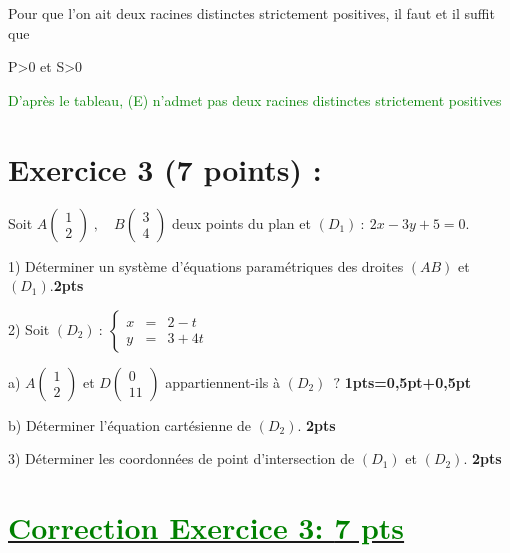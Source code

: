 \documentclass[12pt]{article}
\begin{document}
Pour que l'on ait deux racines distinctes strictement positives, il faut et il suffit que

 P>0 et S>0

\textcolor{green}{D'après le tableau, (E) n'admet pas deux racines distinctes strictement positives}

 

\section*{Exercice 3 (7 points) :}
Soit $A\begin{pmatrix} 1 \\ 2\end{pmatrix}\;,\quad B\begin{pmatrix} 3 \\ 4\end{pmatrix}$ deux points du plan et $(D_{1})\ :\ 2x-3y+5=0.$

1) Déterminer un système d'équations paramétriques des droites $(AB)$ et $(D_{1}).$\textbf{2pts}

2) Soit $(D_{2})\ :\ \left\lbrace\begin{array}{rcl} x&=&2-t \\ y&=&3+4t\end{array}\right.$

a) $A\begin{pmatrix} 1 \\ 2\end{pmatrix}$ et $D\begin{pmatrix} 0 \\ 11\end{pmatrix}$ appartiennent-ils à $(D_{2})\;\ ?$ \textbf{1pts=0,5pt+0,5pt}

b) Déterminer l'équation cartésienne de $(D_{2})$. \textbf{2pts}

3) Déterminer les coordonnées de point d'intersection de $(D_{1})$ et $(D_{2})$. \textbf{2pts}
\section*{\underline{\textcolor{green}{Correction Exercice 3: \textbf{7 pts}}}}
\end{document}
